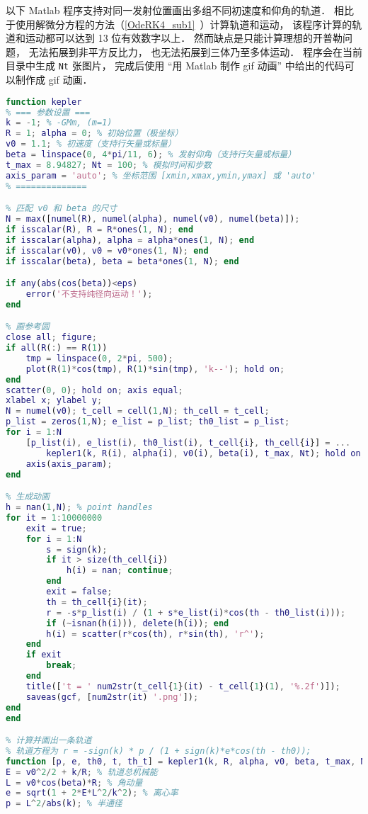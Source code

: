 以下 Matlab 程序支持对同一发射位置画出多组不同初速度和仰角的轨道． 相比于使用解微分方程的方法（\autoref{OdeRK4_sub1}~）计算轨道和运动， 该程序计算的轨道和运动都可以达到 13 位有效数字以上． 然而缺点是只能计算理想的开普勒问题， 无法拓展到非平方反比力， 也无法拓展到三体乃至多体运动． 程序会在当前目录中生成 \verb|Nt| 张图片， 完成后使用 “用 Matlab 制作 gif 动画” 中给出的代码可以制作成 gif 动画．

\begin{lstlisting}[language=matlab,caption=kepler.m]
% 已知初始位置、发射速度、发射方向， 求轨道以及运动方程
function kepler
% === 参数设置 ===
k = -1; % -GMm, (m=1)
R = 1; alpha = 0; % 初始位置（极坐标）
v0 = 1.1; % 初速度（支持行矢量或标量）
beta = linspace(0, 4*pi/11, 6); % 发射仰角（支持行矢量或标量）
t_max = 8.94827; Nt = 100; % 模拟时间和步数
axis_param = 'auto'; % 坐标范围 [xmin,xmax,ymin,ymax] 或 'auto'
% ==============

% 匹配 v0 和 beta 的尺寸
N = max([numel(R), numel(alpha), numel(v0), numel(beta)]);
if isscalar(R), R = R*ones(1, N); end
if isscalar(alpha), alpha = alpha*ones(1, N); end
if isscalar(v0), v0 = v0*ones(1, N); end
if isscalar(beta), beta = beta*ones(1, N); end

if any(abs(cos(beta))<eps)
    error('不支持纯径向运动！');
end

% 画参考圆
close all; figure;
if all(R(:) == R(1))
    tmp = linspace(0, 2*pi, 500);
    plot(R(1)*cos(tmp), R(1)*sin(tmp), 'k--'); hold on;
end
scatter(0, 0); hold on; axis equal;
xlabel x; ylabel y;
N = numel(v0); t_cell = cell(1,N); th_cell = t_cell;
p_list = zeros(1,N); e_list = p_list; th0_list = p_list;
for i = 1:N
    [p_list(i), e_list(i), th0_list(i), t_cell{i}, th_cell{i}] = ...
        kepler1(k, R(i), alpha(i), v0(i), beta(i), t_max, Nt); hold on;
    axis(axis_param);
end

% 生成动画
h = nan(1,N); % point handles
for it = 1:10000000
    exit = true;
    for i = 1:N
        s = sign(k);
        if it > size(th_cell{i})
            h(i) = nan; continue;
        end
        exit = false;
        th = th_cell{i}(it);
        r = -s*p_list(i) / (1 + s*e_list(i)*cos(th - th0_list(i)));
        if (~isnan(h(i))), delete(h(i)); end
        h(i) = scatter(r*cos(th), r*sin(th), 'r^');
    end
    if exit
        break;
    end
    title(['t = ' num2str(t_cell{1}(it) - t_cell{1}(1), '%.2f')]);
    saveas(gcf, [num2str(it) '.png']);
end
end

% 计算并画出一条轨道
% 轨道方程为 r = -sign(k) * p / (1 + sign(k)*e*cos(th - th0));
function [p, e, th0, t, th_t] = kepler1(k, R, alpha, v0, beta, t_max, Nt)
E = v0^2/2 + k/R; % 轨道总机械能
L = v0*cos(beta)*R; % 角动量
e = sqrt(1 + 2*E*L^2/k^2); % 离心率
p = L^2/abs(k); % 半通径


\end{lstlisting}
